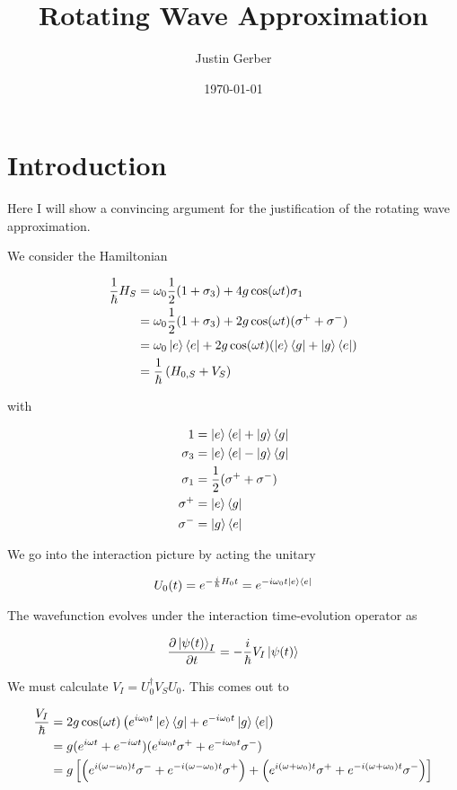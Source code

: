 \documentclass[12pt]{article}
\begin{document}
\title{Rotating Wave Approximation}
\author{Justin Gerber}
\date{\today}
\maketitle

\section{Introduction}

Here I will show a convincing argument for the justification of the rotating wave approximation.

We consider the Hamiltonian

\begin{align}
\frac{1}{\hbar}H_S &= \omega_0 \frac{1}{2}(1+\sigma_3) + 4g \cos(\omega t)\sigma_1\\
&= \omega_0 \frac{1}{2}(1+\sigma_3) + 2g \cos(\omega t)(\sigma^+ + \sigma^-)\\
&= \omega_0 \ket{e}\bra{e} + 2g \cos(\omega t) (\ket{e}\bra{g} + \ket{g}\bra{e})\\
&= \frac{1}{\hbar}\left(H_{0,S} + V_S\right)
\end{align}

with

\begin{align}
1 &= \ket{e}\bra{e} + \ket{g}\bra{g}\\
\sigma_3 &= \ket{e}\bra{e} - \ket{g}\bra{g}\\
\sigma_1 &= \frac{1}{2}(\sigma^+ + \sigma^-)\\
\sigma^+ &= \ket{e}\bra{g}\\
\sigma^- &= \ket{g}\bra{e}
\end{align}

We go into the interaction picture by acting the unitary

\begin{align}
U_0(t) = e^{-\frac{i}{\hbar} H_0t} = e^{-i \omega_0 t \ket{e}\bra{e}}
\end{align}

The wavefunction evolves under the interaction time-evolution operator as

\begin{align}
\frac{\partial \ket{\psi(t)}_I}{\partial t} = -\frac{i}{\hbar} V_I \ket{\psi(t)}
\end{align}

We must calculate $V_I = U_0^{\dag} V_S U_0$. This comes out to

\begin{align}
\frac{V_I}{\hbar} &= 2g \cos(\omega t)\left( e^{i\omega_0t} \ket{e}\bra{g} + e^{-i\omega_0 t} \ket{g}\bra{e}\right)\\
&= g(e^{i\omega t} + e^{-i\omega t})(e^{i\omega_0 t}\sigma^+ + e^{-i\omega_0 t}\sigma^-)\\
&= g \left[\left(e^{i(\omega-\omega_0)t} \sigma^- + e^{-i(\omega-\omega_0)t}\sigma^+\right) + \left(e^{i(\omega + \omega_0)t}\sigma^+ + e^{-i(\omega + \omega_0)t}\sigma^-\right)\right]
\end{align}
\end{document}
